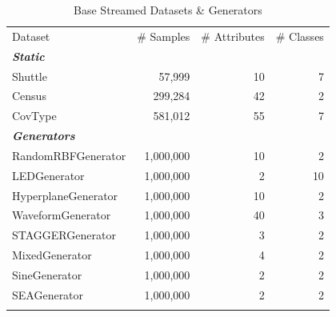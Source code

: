 \documentclass[reqno]{vcuthesis}
\numberwithin{equation}{chapter}
\begin{document}
\begin{table}[H]
\caption{Base Streamed Datasets \& Generators}
\footnotesize
\centering
\label{tab:dsDataset}
\begin{tabularx}{0.9\textwidth}{l@{\extracolsep{\fill}}rrr}
\hline\noalign{\smallskip}
Dataset & \# Samples & \# Attributes & \# Classes \\
\noalign{\smallskip}\hline\noalign{\smallskip}
\textbf{\textit{Static}} 		&				&				& 		\\
Shuttle 						&    57,999		&   10 			& 	7 \\
Census							&   299,284     &  	42			& 	2 \\
CovType		 					&   581,012     & 	55			& 	7 \\
\textbf{\textit{Generators}} 	&				&				& 		\\
RandomRBFGenerator 	       	 	& 	1,000,000	& 	10	        & 	2 \\ %
LEDGenerator	 	       	 	& 	1,000,000	& 	2	        & 	10 \\ %
HyperplaneGenerator 	        & 	1,000,000	& 	10	        & 	2 \\ %
WaveformGenerator 	       	 	& 	1,000,000	& 	40	        & 	3 \\ %
STAGGERGenerator 	 			& 	1,000,000	& 	3	        & 	2 \\ %
MixedGenerator 					& 	1,000,000	& 	4	        & 	2 \\%
SineGenerator 					& 	1,000,000	& 	2	        & 	2 \\%
SEAGenerator	       			& 	1,000,000	& 	2	        & 	2 \\ %
\noalign{\smallskip}\hline
\end{tabularx}
\end{table}
\end{document}
